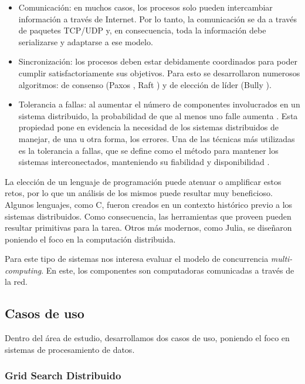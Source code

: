 \documentclass[11pt]{article}
\let\Oldsubsection\subsection
\renewcommand{\subsection}{\FloatBarrier\Oldsubsection}
\let\Oldsubsubsection\subsubsection
\renewcommand{\subsubsection}{\FloatBarrier\Oldsubsubsection}
\newcommand{\english}[1]{\textit{#1}}
\begin{document}
\begin{itemize}
    \item Comunicación: en muchos casos, los procesos solo pueden intercambiar información a través de Internet. Por lo tanto, la comunicación se da a través de paquetes TCP/UDP y, en consecuencia, toda la información debe serializarse y adaptarse a ese modelo.

    \item Sincronización: los procesos deben estar debidamente coordinados para poder cumplir satisfactoriamente sus objetivos. Para esto se desarrollaron numerosos algoritmos: de consenso (Paxos \cite{sis_dist:paxos}, Raft \cite{sis_dist:raft}) y de elección de líder (Bully \cite{sis_dist:bully}).
    \item Tolerancia a fallas: al aumentar el número de componentes involucrados en un sistema distribuido, la probabilidad de que al menos uno falle aumenta \cite{sis_dist:growth_fail}.
    Esta propiedad pone en evidencia la necesidad de los sistemas distribuidos de manejar, de una u otra forma, los errores. Una de las técnicas más utilizadas es la tolerancia a fallas, que se define como el método para mantener los sistemas interconectados, manteniendo su fiabilidad y disponibilidad \cite{sis_dist:fault_tol}.
\end{itemize}

La elección de un lenguaje de programación puede atenuar o amplificar estos retos, por lo que un análisis de los mismos puede resultar muy beneficioso. Algunos lenguajes, como C, fueron creados en un contexto histórico previo a los sistemas distribuidos. Como consecuencia, las herramientas que proveen pueden resultar primitivas para la tarea. Otros más modernos, como Julia, se diseñaron poniendo el foco en la computación distribuida.

Para este tipo de sistemas nos interesa evaluar el modelo de concurrencia \english{multi-computing}. En este, los componentes son computadoras comunicadas a través de la red.

\newpage

\subsection{Casos de uso}

Dentro del área de estudio, desarrollamos dos casos de uso, poniendo el foco en sistemas de procesamiento de datos.

\subsubsection{Grid Search Distribuido}
\end{document}
